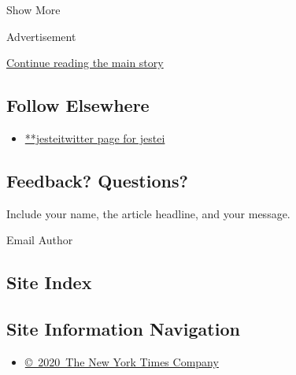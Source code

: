 Show More

Advertisement

\protect\hyperlink{after-mid2}{Continue reading the main story}

\hypertarget{follow-elsewhere}{%
\subsection{Follow Elsewhere}\label{follow-elsewhere}}

\begin{itemize}
\tightlist
\item
  \href{https://twitter.com/jestei}{**jesteitwitter page for jestei}
\end{itemize}

\hypertarget{feedback-questions}{%
\subsection{Feedback? Questions?}\label{feedback-questions}}

Include your name, the article headline, and your message.

Email Author

\hypertarget{site-index}{%
\subsection{Site Index}\label{site-index}}

\hypertarget{site-information-navigation}{%
\subsection{Site Information
Navigation}\label{site-information-navigation}}

\begin{itemize}
\tightlist
\item
  \href{https://help.nytimes3xbfgragh.onion/hc/en-us/articles/115014792127-Copyright-notice}{©~2020~The
  New York Times Company}
\end{itemize}

